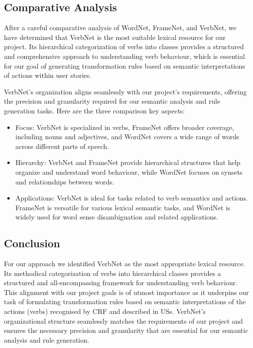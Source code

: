 \subsection{Comparative Analysis} \label{sec_5_campare}
After a careful comparative analysis of WordNet, FrameNet, and VerbNet, we have determined that VerbNet is the most suitable lexical resource for our project. Its hierarchical categorization of verbs into classes provides a structured and comprehensive approach to understanding verb behaviour, which is essential for our goal of generating transformation rules based on semantic interpretations of actions within user stories. 

VerbNet's organization aligns seamlessly with our project's requirements, offering the precision and granularity required for our semantic analysis and rule generation tasks.
Here are the three comparison key aspects:
\begin{itemize}
\item Focus: VerbNet is specialized in verbs, FrameNet offers broader coverage, including nouns and adjectives, and WordNet covers a wide range of words across different parts of speech.
\item Hierarchy: VerbNet and FrameNet provide hierarchical structures that help organize and understand word behaviour, while WordNet focuses on synsets and relationships between words.
\item Applications: VerbNet is ideal for tasks related to verb semantics and actions. FrameNet is versatile for various lexical semantic tasks, and WordNet is widely used for word sense disambiguation and related applications.
\end{itemize}
\subsection{Conclusion}\label{nlp_bottom_line}
For our approach we identified VerbNet as the most appropriate lexical resource. Its methodical categorization of verbs into hierarchical classes provides a structured and all-encompassing framework for understanding verb behaviour. This alignment with our project goals is of utmost importance as it underpins our task of formulating transformation rules based on semantic interpretations of the actions (verbs) recognised by CRF and described in USs. VerbNet's organizational structure seamlessly matches the requirements of our project and ensures the necessary precision and granularity that are essential for our semantic analysis and rule generation.

